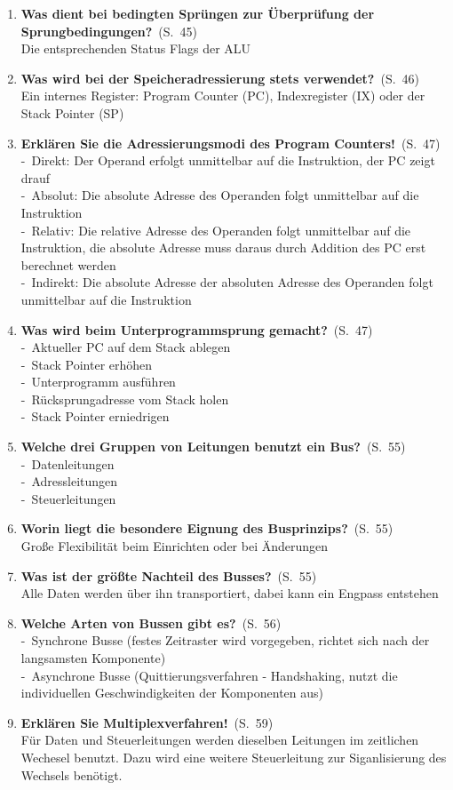 \documentclass[a4paper,12pt]{article}
\newcommand{\question}[3]{\pagebreak[3]\item {\textbf{#1?}}\ (S.\ #2)#3}
\newcommand{\statement}[3]{\pagebreak[3]\item {\textbf{#1!}}\ (S.\ #2)#3}
\newcommand{\catchword}[1]{\\-\ #1}
\newcommand{\normaltext}[1]{\\#1}
\newcommand{\page}[1]{#1}
\begin{document}
\begin{enumerate}
  \question{Was dient bei bedingten Sprüngen zur Überprüfung der Sprungbedingungen}{\page{45}}
  {
    \normaltext{Die entsprechenden Status Flags der ALU}
  }

  \question{Was wird bei der Speicheradressierung stets verwendet}{\page{46}}
  {
    \normaltext{Ein internes Register: Program Counter (PC), Indexregister (IX)
                oder der Stack Pointer (SP)}
  }

  \statement{Erklären Sie die Adressierungsmodi des Program Counters}{\page{47}}
  {
    \catchword{Direkt: Der Operand erfolgt unmittelbar auf die Instruktion, der PC zeigt drauf}
    \catchword{Absolut: Die absolute Adresse des Operanden folgt unmittelbar auf die Instruktion}
    \catchword{Relativ: Die relative Adresse des Operanden folgt unmittelbar auf die Instruktion,
               die absolute Adresse muss daraus durch Addition des PC erst berechnet werden}
    \catchword{Indirekt: Die absolute Adresse der absoluten Adresse des Operanden folgt unmittelbar
               auf die Instruktion}
  }

  \question{Was wird beim Unterprogrammsprung gemacht}{\page{47}}
  {
    \catchword{Aktueller PC auf dem Stack ablegen}
    \catchword{Stack Pointer erhöhen}
    \catchword{Unterprogramm ausführen}
    \catchword{Rücksprungadresse vom Stack holen}
    \catchword{Stack Pointer erniedrigen}
  }

  \question{Welche drei Gruppen von Leitungen benutzt ein Bus}{\page{55}}
  {
    \catchword{Datenleitungen}
    \catchword{Adressleitungen}
    \catchword{Steuerleitungen}
  }

  \question{Worin liegt die besondere Eignung des Busprinzips}{\page{55}}
  {
    \normaltext{Große Flexibilität beim Einrichten oder bei Änderungen}
  }

  \question{Was ist der größte Nachteil des Busses}{\page{55}}
  {
    \normaltext{Alle Daten werden über ihn transportiert, dabei kann ein Engpass entstehen}
  }

    \question{Welche Arten von Bussen gibt es}{\page{56}}
  {
    \catchword{Synchrone Busse (festes Zeitraster wird vorgegeben, richtet sich nach der 
    langsamsten Komponente)}
    \catchword{Asynchrone Busse (Quittierungsverfahren - Handshaking, nutzt die individuellen
    Geschwindigkeiten der Komponenten aus)}
  }

  \statement{Erklären Sie Multiplexverfahren}{\page{59}}
  {
    \normaltext{Für Daten und Steuerleitungen werden dieselben Leitungen im zeitlichen Wechesel
    benutzt. Dazu wird eine weitere Steuerleitung zur Siganlisierung des Wechsels benötigt.}
  }


\end{enumerate}
\end{document}
